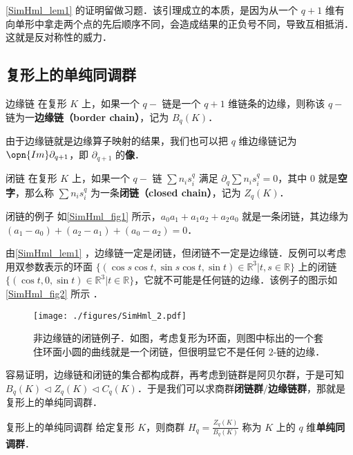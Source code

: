 \autoref{SimHml_lem1} 的证明留做习题．该引理成立的本质，是因为从一个 $q+1$ 维有向单形中拿走两个点的先后顺序不同，会造成结果的正负号不同，导致互相抵消．这就是反对称性的威力．


\subsection{复形上的单纯同调群}


\begin{definition}{边缘链}
在复形 $K$ 上，如果一个 $q-$ 链是一个 $q+1$ 维链条的边缘，则称该 $q-$ 链为一\textbf{边缘链（border chain）}，记为 $B_q(K)$．
\end{definition}

由于边缘链就是边缘算子映射的结果，我们也可以把 $q$ 维边缘链记为 $\opn{Im}\partial_{q+1}$，即 $\partial_{q+1}$ 的\textbf{像}．

\begin{definition}{闭链}
在复形 $K$ 上，如果一个 $q-$ 链 $\sum n_is^q_i$ 满足 $\partial_q\sum n_is^q_i=0$，其中 $0$ 就是\textbf{空字}，那么称 $\sum n_is^q_i$ 为一条\textbf{闭链（closed chain）}，记为 $Z_q(K)$．
\end{definition}

\begin{example}{闭链的例子}
如\autoref{SimHml_fig1} 所示，$a_0a_1+a_1a_2+a_2a_0$ 就是一条闭链，其边缘为 $(a_1-a_0)+(a_2-a_1)+(a_0-a_2)=0$．
\end{example}

由\autoref{SimHml_lem1} ，边缘链一定是闭链，但闭链不一定是边缘链．反例可以考虑用双参数表示的环面 $\{(\cos s\cos t, \sin s\cos t, \sin t)\in\mathbb{R}^3|t, s\in\mathbb{R}\}$ 上的闭链 $\{(\cos t, 0, \sin t)\in\mathbb{R}^3|t\in\mathbb{R}\}$，它就不可能是任何链的边缘．该例子的图示如\autoref{SimHml_fig2} 所示 ．


\begin{figure}[ht]
\centering
\texttt{[image: ./figures/SimHml\_2.pdf]}
\caption{非边缘链的闭链例子．如图，考虑复形为环面，则图中标出的一个套住环面小圆的曲线就是一个闭链，但很明显它不是任何 $2$-链的边缘．} \label{SimHml_fig2}
\end{figure}




容易证明，边缘链和闭链的集合都构成群，再考虑到链群是阿贝尔群，于是可知 $B_q(K)\triangleleft Z_q(K)\triangleleft C_q(K)$．于是我们可以求商群\textbf{闭链群}$/$\textbf{边缘链群}，那就是复形上的单纯同调群．


\begin{definition}{复形上的单纯同调群}
给定复形 $K$，则商群 $H_q=\frac{Z_q(K)}{B_q(K)}$ 称为 $K$ 上的 $q$ 维\textbf{单纯同调群}．
\end{definition}




